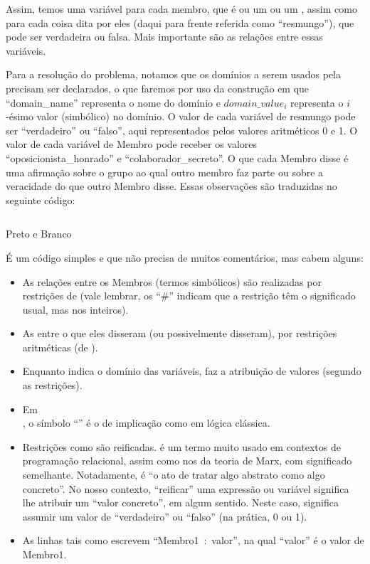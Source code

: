 \documentclass{article}
\begin{document}
Assim, temos uma variável para cada membro, que é ou um
 ou um ,
assim como para cada coisa dita por eles (daqui para frente referida
como ``resmungo''), que pode ser verdadeira ou falsa. Mais importante
são as relações entre essas variáveis.

Para a resolução do problema, notamos que os domínios a serem usados
pela  precisam ser declarados, o que faremos
por uso da construção  em
que ``domain\_name'' representa o nome do domínio e $domain\_value_i$
representa o $i$-ésimo valor (simbólico) no domínio.  O valor de cada
variável de resmungo pode ser ``verdadeiro'' ou ``falso'', aqui
representados pelos valores aritméticos 0 e 1. O valor de cada
variável de Membro pode receber os valores ``oposicionista\_honrado''
e ``colaborador\_secreto''. O que cada Membro disse é uma afirmação
sobre o grupo ao qual outro membro faz parte ou sobre a veracidade do
que outro Membro disse. Essas observações são traduzidas no seguinte
código:

\begin{listing}[H]
  \inputminted{prolog}{../Exemplos/Cap10/prog1_pretoEbranco.ecl}
  \caption{Preto e Branco}
\end{listing}

É um código simples e que não precisa de muitos comentários, mas cabem
alguns:

\begin{itemize}
\item As relações entre os Membros (termos simbólicos) são
  realizadas por restrições de  (vale
  lembrar, os ``\#'' indicam que a restrição têm o significado
  usual, mas nos inteiros).
\item As entre o que eles disseram (ou possivelmente disseram), por
  restrições aritméticas (de ).
\item Enquanto  indica o domínio das variáveis,
   faz a atribuição de
  valores (segundo as restrições).
\item Em 
  \\, o símbolo
  ``\codigo{=>}'' é o de implicação como em lógica clássica.
\item Restrições como  são
  reificadas.  é um termo muito usado em
  contextos de programação relacional, assim como nos da teoria de
  Marx, com significado semelhante. Notadamente, é ``o ato de tratar
  algo abstrato como algo concreto''. No nosso contexto,
  ``reificar'' uma expressão ou variável significa lhe atribuir um
  ``valor concreto'', em algum sentido. Neste caso, significa assumir
  um valor de ``verdadeiro'' ou ``falso'' (na prática, 0 ou 1).
\item As linhas tais como 
  escrevem ``Membro1~:~valor'', na qual ``valor'' é o valor de
  Membro1.
\end{itemize}
\end{document}
